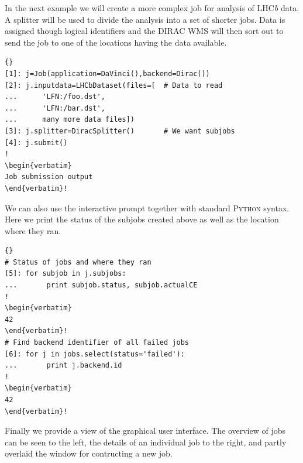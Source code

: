 \documentclass{elsart}
\def\lhcb {LHC{\em b\/}\xspace}
\def\dirac{DIRAC\xspace}
\def\python {\textsc{Python}\xspace}
\begin{document}
\vspace{-2ex}
In the next example we will create a more complex job for analysis of \lhcb
data. A splitter will be used to divide the analysis into a set of shorter
jobs. Data is assigned though logical identifiers and the \dirac WMS will then
sort out to send the job to one of the locations having the data available.
\tiny
\begin{lstlisting}[escapechar=!]{}
[1]: j=Job(application=DaVinci(),backend=Dirac())
[2]: j.inputdata=LHCbDataset(files=[  # Data to read
...      'LFN:/foo.dst',
...      'LFN:/bar.dst',
...      many more data files])
[3]: j.splitter=DiracSplitter()       # We want subjobs
[4]: j.submit()
!
\begin{verbatim}
Job submission output
\end{verbatim}!
\end{lstlisting}
\normalsize

\vspace{-2ex}
We can also use the interactive prompt together with standard \python syntax.
Here we print the status of the subjobs created above as well as the location
where they ran.
\tiny
\begin{lstlisting}[escapechar=!]{}
# Status of jobs and where they ran
[5]: for subjob in j.subjobs: 
...       print subjob.status, subjob.actualCE
!
\begin{verbatim}
42
\end{verbatim}!
# Find backend identifier of all failed jobs
[6]: for j in jobs.select(status='failed'):
...       print j.backend.id
!
\begin{verbatim}
42
\end{verbatim}!
\end{lstlisting}
\normalsize

\vspace{-2ex}
Finally we provide a view of the graphical user interface. The overview of jobs
can be seen to the left, the details of an individual job to the right, and
partly overlaid the window for contructing a new job.
\end{document}
